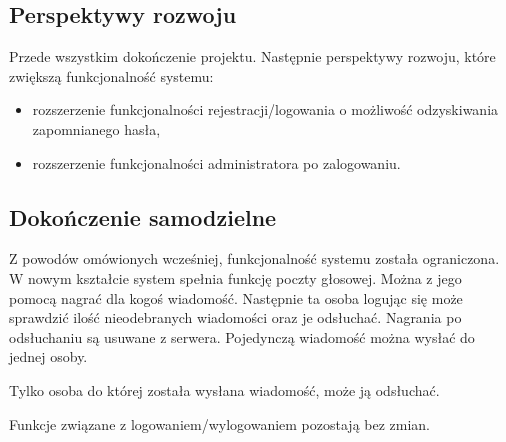 \documentclass[12pt,a4paper]{article}
\begin{document}
	\subsection{Perspektywy rozwoju}
	\par Przede wszystkim dokończenie projektu. Następnie perspektywy rozwoju, które zwiększą funkcjonalność systemu:
	\begin{itemize}
		\item rozszerzenie funkcjonalności rejestracji/logowania o możliwość odzyskiwania zapomnianego hasła,
		\item rozszerzenie funkcjonalności administratora po zalogowaniu.
	\end{itemize}

	\subsection{Dokończenie samodzielne}
	\par Z powodów omówionych wcześniej, funkcjonalność systemu została ograniczona. W nowym kształcie system spełnia funkcję poczty głosowej. Można z jego pomocą nagrać dla kogoś wiadomość. Następnie ta osoba logując się może sprawdzić ilość nieodebranych wiadomości oraz je odsłuchać. Nagrania po odsłuchaniu są usuwane z serwera. Pojedynczą wiadomość można wysłać do jednej osoby.
	\par Tylko osoba do której została wysłana wiadomość, może ją odsłuchać.
	\par Funkcje związane z logowaniem/wylogowaniem pozostają bez zmian.
	
	
\end{document}
